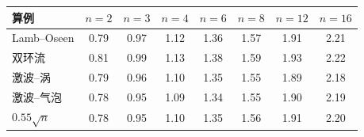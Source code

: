 \begin{tabular}{lccccccc}\toprule 算例 & $n=2$ & $n=3$ & $n=4$ & $n=6$ & $n=8$ & $n=12$ & $n=16$\\\midrule
Lamb–Oseen & 0.79 & 0.97 & 1.12 & 1.36 & 1.57 & 1.91 & 2.21\\
双环流 & 0.81 & 0.99 & 1.13 & 1.38 & 1.59 & 1.93 & 2.22\\
激波–涡 & 0.79 & 0.96 & 1.10 & 1.35 & 1.55 & 1.89 & 2.18\\
激波–气泡 & 0.78 & 0.95 & 1.09 & 1.34 & 1.55 & 1.90 & 2.19\\
$0.55\sqrt n$ & 0.78 & 0.95 & 1.10 & 1.35 & 1.56 & 1.91 & 2.20\\\bottomrule\end{tabular}